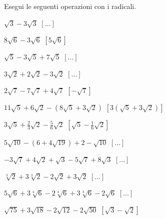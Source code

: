 \subsubsection*{}

\begin{esercizio}[\Ast]
 \label{ese:2.50}
Esegui le seguenti operazioni con i radicali.
 \begin{multicols}{2}
 \begin{enumeratea}
 \item $\sqrt 3-3\sqrt 3$
  \hfill $\left[...\right]$
 \item $8\sqrt 6-3\sqrt 6$
  \hfill $\left[5\sqrt 6\right]$
 \item $\sqrt 5-3\sqrt 5+7\sqrt 5$
  \hfill $\left[...\right]$
 \item $3\sqrt 2+2\sqrt 2-3\sqrt 2$
  \hfill $\left[...\right]$
 \item $2\sqrt 7-7\sqrt 7+4\sqrt 7$
  \hfill $\left[-\sqrt 7\right]$
 \item $11\sqrt 5+6\sqrt 2-(8\sqrt 5+3\sqrt 2)$
  \hfill $\left[3(\sqrt 5+3\sqrt 2)\right]$
 \item $3\sqrt 5+\frac 2 3\sqrt 2-\frac 5 6\sqrt 2$
  \hfill $\left[\sqrt 5-\frac 1 6\sqrt 2\right]$
 \item $5\sqrt{10}-\left(6+4\sqrt{19}\right)+2-\sqrt{10}$
  \hfill $\left[...\right]$
 \item $-3\sqrt 7+4\sqrt 2+\sqrt 3-5\sqrt 7+8\sqrt 3$
  \hfill $\left[...\right]$
 \item $\sqrt[3]2+3\sqrt[3]2-2\sqrt 2+3\sqrt 2$
  \hfill $\left[...\right]$
 \item $5\sqrt 6+3\sqrt[4]6-2\sqrt[4]6+3\sqrt[3]6-2\sqrt 6$
  \hfill $\left[...\right]$
 \item $\sqrt{75}+3\sqrt{18}-2\sqrt{12}-2\sqrt{50}$
  \hfill $\left[\sqrt 3-\sqrt 2\right]$
 \end{enumeratea}
 \end{multicols}
\end{esercizio}

